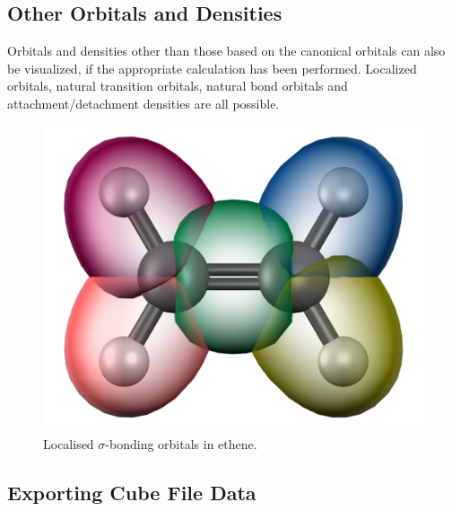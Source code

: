 \documentclass[a4paper,12pt]{article}
\begin{document}
\subsection{Other Orbitals and Densities}

Orbitals and densities other than those based on the canonical orbitals can
also be visualized, if the appropriate calculation has been performed.  Localized
orbitals, natural transition orbitals, natural bond orbitals and
attachment/detachment densities are all possible.

\begin{figure}[h]
\begin{center}
\includegraphics[scale=0.25]{figures/LocalizedBonds.png}
\caption{Localised $\sigma$-bonding orbitals in ethene.}
\label{fig:mo}
\end{center}
\end{figure}




\subsection{Exporting Cube File Data}
\end{document}
